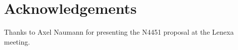 \section{Acknowledgements}

Thanks to Axel Naumann for presenting the N4451 proposal at the Lenexa meeting.
